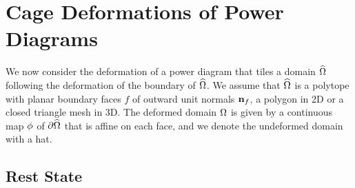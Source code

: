 \documentclass[main.tex]{subfiles}
\begin{document}
\section{Cage Deformations of Power Diagrams}
\label{sec:appendix-distortion}

We now consider the deformation of a power diagram that tiles a domain $\widehat{\Omega}$ following the deformation of the boundary of $\widehat{\Omega}$.
We assume that $\widehat{\Omega}$ is a polytope with planar boundary faces $f$ of outward unit normals $\mathbf{n}_f$, \eg a polygon in 2D or a closed triangle mesh in 3D.
The deformed domain $\Omega$ is given by a continuous map $\phi$ of $\partial\widehat{\Omega}$ that is affine on each face, and we denote the undeformed domain with a hat.

\subsection{Rest State}
\label{sec:appendix-distortion-rest}
\end{document}
